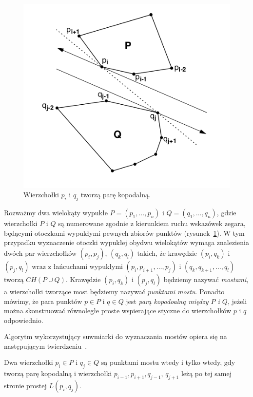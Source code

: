 \begin{figure}[htb]
  \centering
  \includegraphics[scale=0.5]{img/calipers4}
  \caption{\label{img:calipers4} Wierzchołki $p_i$ i $q_j$ tworzą parę
    kopodalną.}
\end{figure}

Rozważmy dwa wielokąty wypukłe $P = (p_1, \ldots, p_n)$ i $Q = (q_1,
\ldots, q_n)$, gdzie wierzchołki $P$ i $Q$ są numerowane zgodnie z
kierunkiem ruchu wskazówek zegara, będącymi otoczkami wypukłymi
pewnych zbiorów punktów (rysunek~\ref{img:calipers4}). W tym przypadku
wyznaczenie otoczki wypukłej obydwu wielokątów wymaga znalezienia
dwóch par wierzchołków $(p_i, p_j)$, $(q_k, q_l)$ takich, że krawędzie
$(p_i, q_k)$ i $(p_j, q_l)$ wraz z łańcuchami wypukłymi $(p_i,
p_{i+1}, \ldots, p_j)$ i $(q_k, q_{k+1}, \ldots, q_l)$ tworzą $CH(P
\cup Q)$. Krawędzie $(p_i, q_k)$ i $(p_j, q_l)$ będziemy nazywać
\emph{mostami}, a wierzchołki tworzące most będziemy nazywać
\emph{punktami mostu}. Ponadto mówimy, że para punktów $p \in P$ i $q
\in Q$ jest \emph{parą kopodoalną między $P$ i $Q$}, jeżeli można
skonstruować równoległe proste wspierające styczne do wierzchołków $p$
i $q$ odpowiednio.

Algorytm wykorzystujący suwmiarki do wyznaczania mostów opiera się na
następującym twierdzeniu~\cite{Toussaint83}.

\begin{twierdzenie}[Toussaint 1983]
\label{thm:bridge}
Dwa wierzchołki $p_i \in P$ i $q_j \in Q$ są punktami mostu wtedy i
tylko wtedy, gdy tworzą parę kopodalną i wierzchołki $p_{i-1},
p_{i+1}, q_{j-1}$, $ q_{j+1}$ leżą po tej samej stronie prostej
$L(p_i, q_j)$.
\end{twierdzenie}

